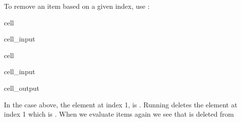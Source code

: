 \documentclass[letterpaper,10pt,english]{jupyterBook}
\begin{document}
\sphinxAtStartPar
To remove an item based on a given index, use :

\begin{sphinxuseclass}{cell}\begin{sphinxVerbatimInput}

\begin{sphinxuseclass}{cell_input}
\begin{sphinxVerbatim}[commandchars=\\\{\}]
  \PYG{p}{[}  \PYG{p}{]}
 \PYG{p}{[}\PYG{p}{]}
\end{sphinxVerbatim}

\end{sphinxuseclass}\end{sphinxVerbatimInput}

\end{sphinxuseclass}
\begin{sphinxuseclass}{cell}\begin{sphinxVerbatimInput}

\begin{sphinxuseclass}{cell_input}
\begin{sphinxVerbatim}[commandchars=\\\{\}]
\end{sphinxVerbatim}

\end{sphinxuseclass}\end{sphinxVerbatimInput}
\begin{sphinxVerbatimOutput}

\begin{sphinxuseclass}{cell_output}
\begin{sphinxVerbatim}
\end{sphinxVerbatim}

\end{sphinxuseclass}\end{sphinxVerbatimOutput}

\end{sphinxuseclass}
\sphinxAtStartPar
In the case above, the element at index 1, is . Running  deletes the element at index 1 which is . When we evaluate items again we see that  is deleted from 
\end{document}
